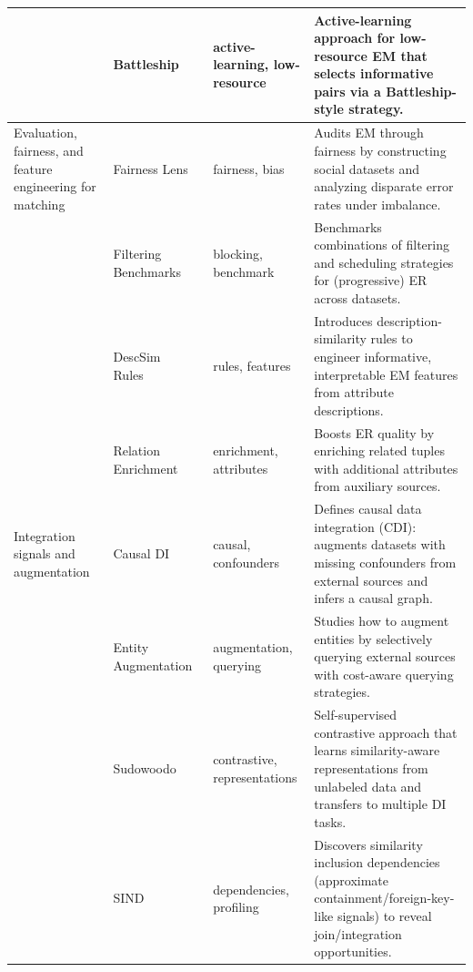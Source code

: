 \documentclass[sigconf]{acmart}
\begin{document}
\begin{table}[!htbp]
\begin{tabularx}{\textwidth}{@{}p{24mm}p{28mm}p{18mm}Y@{}}
~ &
Battleship~\cite{10.1145/3626711} &
active-learning, low-resource &
Active-learning approach for low-resource EM that selects informative pairs via a Battleship-style strategy. \\

\midrule

Evaluation, fairness, and feature engineering for matching &
Fairness Lens~\cite{10.14778/3611479.3611525} &
fairness, bias &
Audits EM through fairness by constructing social datasets and analyzing disparate error rates under imbalance. \\

~ &
Filtering Benchmarks~\cite{10184692} &
blocking, benchmark &
Benchmarks combinations of filtering and scheduling strategies for (progressive) ER across datasets. \\

~ &
DescSim Rules~\cite{11112979} &
rules, features &
Introduces description-similarity rules to engineer informative, interpretable EM features from attribute descriptions. \\

~ &
Relation Enrichment~\cite{10.14778/3681954.3681987} &
enrichment, attributes &
Boosts ER quality by enriching related tuples with additional attributes from auxiliary sources. \\

\midrule

Integration signals and augmentation &
Causal DI~\cite{10.14778/3603581.3603602} &
causal, confounders &
Defines causal data integration (CDI): augments datasets with missing confounders from external sources and infers a causal graph. \\

~ &
Entity Augmentation~\cite{10.14778/3611479.3611535} &
augmentation, querying &
Studies how to augment entities by selectively querying external sources with cost-aware querying strategies. \\

~ &
Sudowoodo~\cite{10184556} &
contrastive, representations &
Self-supervised contrastive approach that learns similarity-aware representations from unlabeled data and transfers to multiple DI tasks. \\

~ &
SIND~\cite{10.1145/3588929} &
dependencies, profiling &
Discovers similarity inclusion dependencies (approximate containment/foreign-key-like signals) to reveal join/integration opportunities. \\

\bottomrule
\end{tabularx}
\end{table}
\end{document}
